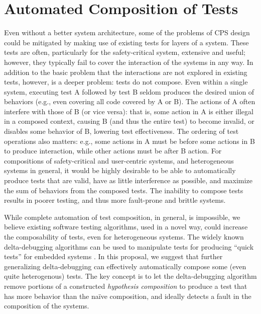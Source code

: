 \section{Automated Composition of Tests}
Even without a better system architecture, some of the problems of CPS design could be mitigated by making use of existing tests for layers of a system.  These tests are often,
particularly for the safety-critical system, extensive and useful;
however, they typically fail to cover the interaction of the systems
in any way.  In addition to the basic problem that the interactions
are not explored in existing tests, however, is a deeper problem:
tests do not compose.  Even within a single system, executing test A
followed by test B seldom produces the desired union of behaviors
(e.g., even covering all code covered by A or B).  The actions of A
often interfere with those of B (or vice versa): that is, some action
in A is either illegal in a composed context, causing B (and thus the
entire test) to become invalid, or
disables some behavior of B, lowering test effectiveness.  The
ordering of test operations also matters: e.g., some actions in A must be
before some actions in B to produce interaction, while other actions
must be after B action.    For compositions of safety-critical and
user-centric systems, and heterogeneous systems in general, it would
be highly desirable to be able to automatically produce tests that are
valid, have as little interference as possible, and maximize the sum
of behaviors from the composed tests.  The inability to compose tests
results in poorer testing, and thus more fault-prone and brittle
systems.

While complete automation of test composition, in general, is
impossible, we 
believe existing software testing algorithms, used in a  novel
way, could increase the composability of tests, even for
heterogeneous systems.  The widely known delta-debugging algorithms can
be used to manipulate tests for producing ``quick tests'' for embedded
systems \cite{icst2014}.  In this proposal, we suggest that further generalizing
delta-debugging can effectively automatically compose some (even quite heterogenous) tests.  The key
concept is to let the delta-debugging algorithm remove portions of a
constructed \emph{hypothesis composition} to produce a test that has more
behavior than the na\"ive composition, and ideally detects a fault in
the composition of the systems.

